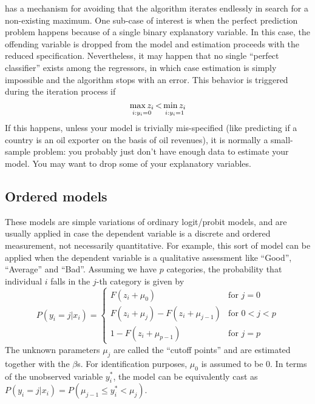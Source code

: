  has a mechanism for avoiding that the algorithm iterates
endlessly in search for a non-existing maximum. One sub-case of
interest is when the perfect prediction problem happens because of a
single binary explanatory variable. In this case, the offending
variable is dropped from the model and estimation proceeds with the
reduced specification. Nevertheless, it may happen that no single
``perfect classifier'' exists among the regressors, in which case
estimation is simply impossible and the algorithm stops with an
error. This behavior is triggered during the iteration process if
\[
  \stackunder{i: y_i = 0}{\max z_i} \, < \,
  \stackunder{i: y_i = 1}{\min z_i}  
\]
If this happens, unless your model is trivially mis-specified (like
predicting if a country is an oil exporter on the basis of oil
revenues), it is normally a small-sample problem: you probably just
don't have enough data to estimate your model. You may want to drop
some of your explanatory variables.

\subsection{Ordered models}
\label{sec:ordered}

These models are simple variations of ordinary logit/probit models,
and are usually applied in case the dependent variable is a discrete
and ordered measurement, not necessarily quantitative. For example,
this sort of model can be applied when the dependent variable is a
qualitative assessment like ``Good'', ``Average'' and ``Bad''.
Assuming we have $p$ categories, the probability that individual $i$
falls in the $j$-th category is given by
%
\begin{equation}
  \label{eq:QR-ordered}
  P(y_i = j | x_i) = \left\{
    \begin{array}{ll}
      F(z_i + \mu_0) & \textrm{for } j = 0 \\
      F(z_i + \mu_j) -  F(z_i + \mu_{j-1}) & \textrm{for } 0 < j < p \\
      1 -  F(z_i + \mu_{p-1}) & \textrm{for } j = p 
    \end{array}
    \right.
\end{equation}
%
The unknown parameters $\mu_j$ are called the ``cutoff
points'' and are estimated together with the $\beta$s. For
identification purposes, $\mu_0$ is assumed to be 0. In terms of the
unobserved variable $y^*_i$, the model can be equivalently cast as
$P(y_i = j | x_i) = P(\mu_{j-1} \le y^*_i < \mu_j)$. 

